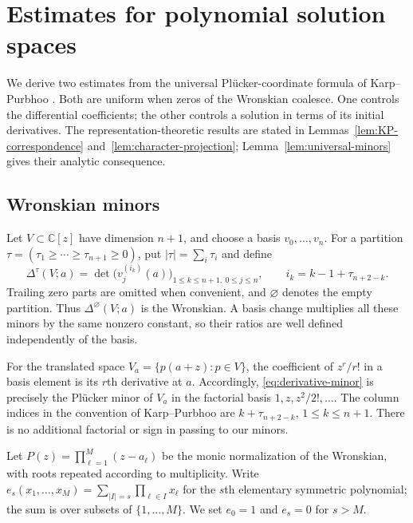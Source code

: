 \documentclass[11pt,letterpaper,reqno]{amsart}
\theoremstyle{remark}
\numberwithin{equation}{section}
\newcommand{\C}{\mathbb C}
\begin{document}
\section{Estimates for polynomial solution spaces}\label{sec:algebra}

We derive two estimates from the universal Pl\"ucker-coordinate formula of
Karp--Purbhoo \cite{KP26}. Both are uniform when zeros of the Wronskian
coalesce. One controls the differential coefficients; the other controls a
solution in terms of its initial derivatives. The representation-theoretic results are stated in
Lemmas~\ref{lem:KP-correspondence} and~\ref{lem:character-projection};
Lemma~\ref{lem:universal-minors} gives their analytic consequence.

\subsection{Wronskian minors}

Let $V\subset\C[z]$ have dimension $n+1$, and choose a basis
$v_0,\ldots,v_n$. For a partition
$\tau=(\tau_1\ge\cdots\ge\tau_{n+1}\ge0)$, put
$|\tau|=\sum_i\tau_i$ and define
\begin{equation}\label{eq:derivative-minor}
 \Delta^\tau(V;a)=\det\bigl(v_j^{(i_k)}(a)\bigr)_{
                    1\le k\le n+1,\ 0\le j\le n},
 \qquad i_k=k-1+\tau_{n+2-k}.
\end{equation}
Trailing zero parts are omitted when convenient, and $\varnothing$ denotes
the empty partition. Thus $\Delta^\varnothing(V;a)$ is the Wronskian. A
basis change multiplies all these minors by the same nonzero constant, so
their ratios are well defined independently of the basis.

For the translated space $V_a=\{p(a+z):p\in V\}$, the coefficient of
$z^r/r!$ in a basis element is its $r$th derivative at $a$. Accordingly,
\eqref{eq:derivative-minor} is precisely the Pl\"ucker minor of $V_a$ in the
factorial basis $1,z,z^2/2!,\ldots$. The column indices in the convention of
Karp--Purbhoo \cite[equation~(2.5)]{KP26} are
$k+\tau_{n+2-k}$, $1\le k\le n+1$. There is no additional factorial or sign
in passing to our minors.

Let $P(z)=\prod_{\ell=1}^M(z-a_\ell)$ be the monic normalization of the
Wronskian, with roots repeated according to multiplicity. Write
$e_s(x_1,\ldots,x_M)=\sum_{|I|=s}\prod_{\ell\in I}x_\ell$ for the
$s$th elementary symmetric polynomial; the sum is over subsets of
$\{1,\ldots,M\}$. We set $e_0=1$ and $e_s=0$ for $s>M$.
\end{document}
